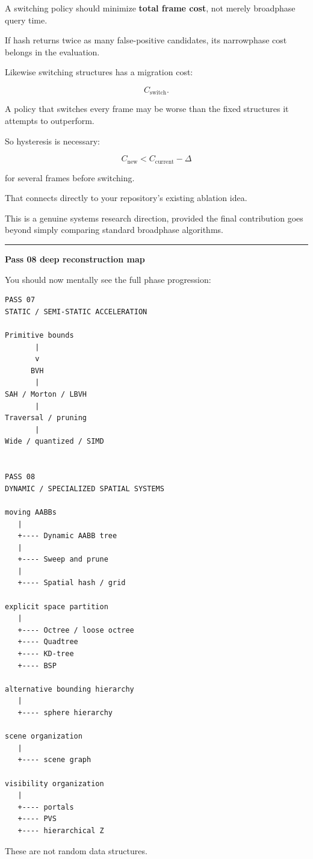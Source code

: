 A switching policy should minimize \textbf{total frame cost}, not merely broadphase query time.

If hash returns twice as many false-positive candidates, its narrowphase cost belongs in the evaluation.

Likewise switching structures has a migration cost:

\[
C_{\text{switch}}.
\]

A policy that switches every frame may be worse than the fixed structures it attempts to outperform.

So hysteresis is necessary:

\[
C_{\text{new}}
<
C_{\text{current}}-\Delta
\]

for several frames before switching.

That connects directly to your repository's existing  ablation idea.

This is a genuine systems research direction, provided the final contribution goes beyond simply comparing standard broadphase algorithms.

\begin{center}\rule{0.5\linewidth}{0.5pt}\end{center}

\textbf{Pass 08 deep reconstruction map}

You should now mentally see the full phase progression:

\begin{verbatim}
PASS 07
STATIC / SEMI-STATIC ACCELERATION

Primitive bounds
       |
       v
      BVH
       |
SAH / Morton / LBVH
       |
Traversal / pruning
       |
Wide / quantized / SIMD


PASS 08
DYNAMIC / SPECIALIZED SPATIAL SYSTEMS

moving AABBs
   |
   +---- Dynamic AABB tree
   |
   +---- Sweep and prune
   |
   +---- Spatial hash / grid

explicit space partition
   |
   +---- Octree / loose octree
   +---- Quadtree
   +---- KD-tree
   +---- BSP

alternative bounding hierarchy
   |
   +---- sphere hierarchy

scene organization
   |
   +---- scene graph

visibility organization
   |
   +---- portals
   +---- PVS
   +---- hierarchical Z
\end{verbatim}

These are not random data structures.

